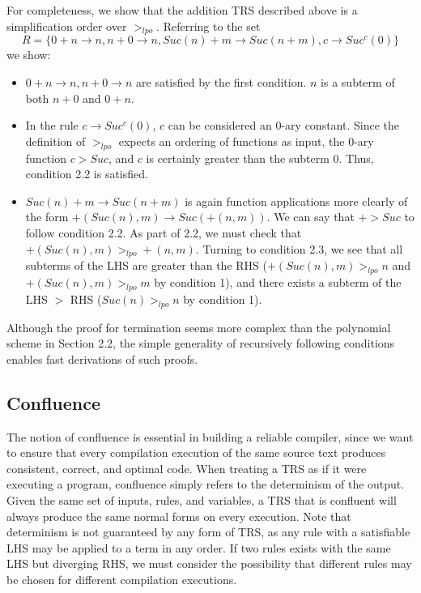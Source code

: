 \documentclass{article}
\begin{document}
For completeness, we show that the addition TRS described above is a simplification order over $>_{lpo}$.
Referring to the set
\[R = \{0 + n \rightarrow n, n + 0 \rightarrow n, Suc(n) + m \rightarrow Suc(n+m), c \rightarrow Suc^c(0)\}\]
we show:
\begin{itemize}
    \item $0 + n \rightarrow n, n + 0 \rightarrow n$ are satisfied by the first condition. $n$ is a subterm of both $n+0$ and $0+n$.
    \item In the rule $c \rightarrow Suc^c(0)$, $c$ can be considered an 0-ary constant. Since the definition of $>_{lpo}$
    expects an ordering of functions as input, the 0-ary function $c > Suc$, and $c$ is certainly greater than the subterm 0.
    Thus, condition 2.2 is satisfied.
    \item $Suc(n) + m \rightarrow Suc(n+m)$ is again function applications more clearly of the form $+(Suc(n), m) \rightarrow Suc(+(n,m))$.
    We can say that $+ > Suc$ to follow condition 2.2. As part of 2.2, we must check that $+(Suc(n), m) >_{lpo} +(n,m)$. Turning to condition 2.3,
    we see that all subterms of the LHS are greater than the RHS ($+(Suc(n), m) >_{lpo} n$ and $+(Suc(n), m) >_{lpo} m$ by condition 1),
    and there exists a subterm of the LHS $>$ RHS ($Suc(n) >_{lpo} n$ by condition 1).
\end{itemize}
Although the proof for termination seems more complex than the polynomial scheme in Section 2.2, the simple generality of recursively following conditions
enables fast derivations of such proofs.

\subsection{Confluence}
The notion of confluence is essential in building a reliable compiler, since we want to ensure that every
compilation execution of the same source text produces consistent, correct, and optimal code.
When treating a TRS as if it were executing a program, confluence simply refers to the determinism of the output.
Given the same set of inputs, rules, and variables, a TRS that is confluent will always produce the same normal forms
on every execution. Note that determinism is not guaranteed by any form of TRS, as any rule with a satisfiable LHS
may be applied to a term in any order. If two rules exists with the same LHS but diverging RHS, we must consider the possibility
that different rules may be chosen for different compilation executions.
\end{document}
